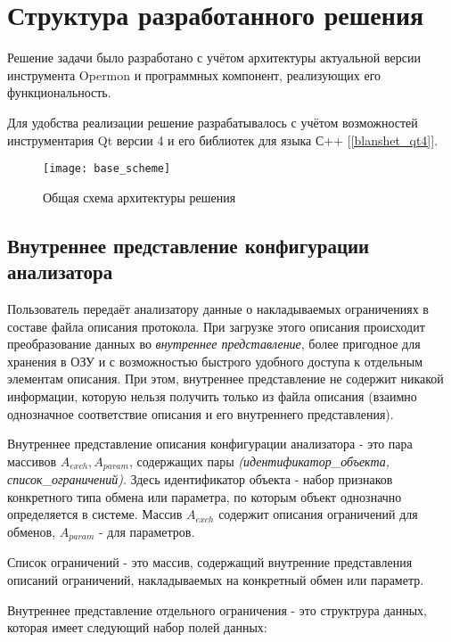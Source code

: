 \section{Структура разработанного решения}
\label{sec:struct}

Решение задачи было разработано с учётом архитектуры актуальной версии 
инструмента Opermon и программных компонент, реализующих его функциональность.

Для удобства реализации решение разрабатывалось с учётом возможностей 
инструментария Qt версии 4 и его библиотек для языка С++ [\ref{blanshet_qt4}].

\begin{figure}[h]
\centering
\texttt{[image: base\_scheme]}
\caption{Общая схема архитектуры решения}
\label{figure:base_scheme}
\end{figure}

\subsection{Внутреннее представление конфигурации анализатора}
\label{subsec:inner}

Пользователь передаёт анализатору данные о накладываемых ограничениях в составе 
файла описания протокола. При загрузке этого описания происходит преобразование 
данных во \textit{внутреннее представление}, более пригодное для хранения в ОЗУ 
и с возможностью быстрого удобного доступа к отдельным элементам описания. При 
этом, внутреннее представление не содержит никакой информации, которую нельзя 
получить только из файла описания (взаимно однозначное соответствие описания и 
его внутреннего представления).

Внутреннее представление описания конфигурации анализатора - это пара массивов 
$A_{exch}, A_{param}$, содержащих пары \textit{(идентификатор\_объекта, 
список\_ограничений)}. Здесь идентификатор объекта - набор признаков 
конкретного типа обмена или параметра, по которым объект однозначно 
определяется в системе. Массив $A_{exch}$ содержит описания ограничений для 
обменов, $A_{param}$ - для параметров. 

Список ограничений - это массив, содержащий внутренние представления описаний 
ограничений, накладываемых на конкретный обмен или параметр. 

Внутреннее представление отдельного ограничения - это структрура данных, 
которая имеет следующий набор полей данных:

